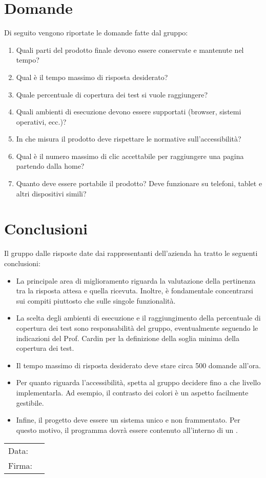 \documentclass[a4paper, 12pt]{article}
\begin{document}
\newpage

\section{Domande}
\label{sec:Domande}
Di seguito vengono riportate le domande fatte dal gruppo:
\begin{enumerate}
    \item Quali parti del prodotto finale devono essere conservate e mantenute nel tempo?
    \item Qual è il tempo massimo di risposta desiderato?
    \item Quale percentuale di copertura dei test si vuole raggiungere?
    \item Quali ambienti di esecuzione devono essere supportati (browser, sistemi operativi, ecc.)?
    \item In che misura il prodotto deve rispettare le normative sull’accessibilità?
    \item Qual è il numero massimo di clic accettabile per raggiungere una pagina partendo dalla home?
    \item Quanto deve essere portabile il prodotto? Deve funzionare su telefoni, tablet e altri dispositivi simili?
\end{enumerate}
\section{Conclusioni}
\label{sec:Conclusioni}
Il gruppo dalle risposte date dai rappresentanti dell’azienda ha tratto le seguenti conclusioni:
\begin{itemize}
    \item La principale area di miglioramento riguarda la valutazione della pertinenza tra la risposta attesa e quella ricevuta. Inoltre, è fondamentale concentrarsi sui compiti piuttosto che sulle singole funzionalità. 
    \item La scelta degli ambienti di esecuzione e il raggiungimento della percentuale di copertura dei test sono responsabilità del gruppo, eventualmente seguendo le indicazioni del Prof. Cardin per la definizione della soglia minima della copertura dei test. 
    \item Il tempo massimo di risposta desiderato deve stare circa 500 domande all’ora. 
    \item Per quanto riguarda l’accessibilità, spetta al gruppo decidere fino a che livello implementarla. Ad esempio, il contrasto dei colori è un aspetto facilmente gestibile. 
    \item Infine, il progetto deve essere un sistema unico e non frammentato. Per questo motivo, il programma dovrà essere contenuto all’interno di un .  
\end{itemize}
\vfill
{\renewcommand{\arraystretch}{2}
\begin{tabular}{l p{5cm}}
    Data: &  \hrulefill \\
    Firma: & \hrulefill \\
\end{tabular}
}
\end{document}
